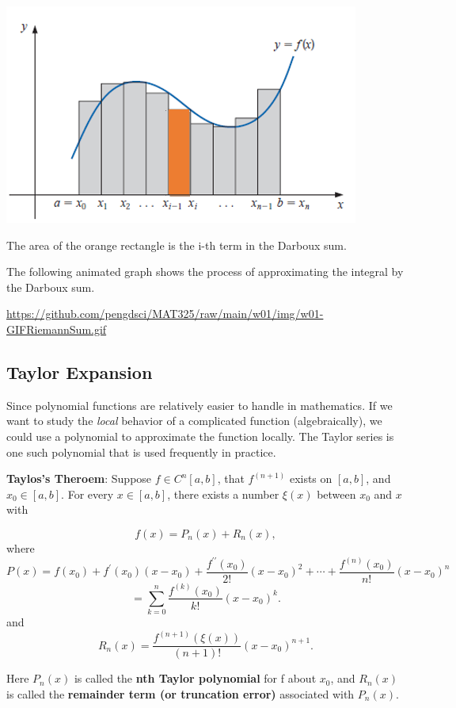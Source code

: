 \documentclass[
]{book}
\begin{document}
\begin{center}\includegraphics[width=0.75\linewidth]{img01/w01-DarbouxSum} \end{center}

The area of the orange rectangle is the i-th term in the Darboux sum.

The following animated graph shows the process of approximating the integral by the Darboux sum.

\url{https://github.com/pengdsci/MAT325/raw/main/w01/img/w01-GIFRiemannSum.gif}

\hypertarget{taylor-expansion}{%
\subsection{Taylor Expansion}\label{taylor-expansion}}

Since polynomial functions are relatively easier to handle in mathematics. If we want to study the \emph{local} behavior of a complicated function (algebraically), we could use a polynomial to approximate the function locally. The Taylor series is one such polynomial that is used frequently in practice.

\textbf{Taylos's Theroem}: Suppose \(f \in C^n[a,b]\), that \(f^{(n+1)}\) exists on \([a,b]\), and \(x_0 \in [a,b]\). For every \(x \in [a,b]\), there exists a number \(\xi(x)\) between \(x_0\) and \(x\) with

\[
f(x) = P_n(x) + R_n(x),
\]
where
\[
P(x) = f(x_0) + f^\prime(x_0)(x - x_0)+\frac{f^{\prime\prime}(x_0)}{2!}(x-x_0)^2+\cdots+\frac{f^{(n)}(x_0)}{n!}(x-x_0)^n
\]
\[
=\sum_{k=0}^n\frac{f^{(k)}(x_0)}{k!}(x-x_0)^k.
\]
and
\[
R_n(x) = \frac{f^{(n+1)}(\xi(x))}{(n+1)!}(x-x_0)^{n+1}.
\]

Here \(P_n(x)\) is called the \textbf{nth Taylor polynomial} for f about \(x_0\), and \(R_n(x)\) is called the \textbf{remainder term (or truncation error)} associated with \(P_n(x)\).
\end{document}
